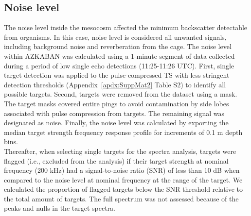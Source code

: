 \subsection{Noise level}
The noise level inside the mesocosm affected the minimum backscatter detectable from organisms. In this case, noise level is considered all unwanted signals, including background noise and reverberation from the cage. The noise level within AZKABAN was calculated using a 1-minute segment of data collected during a period of low single echo detections (11:25-11:26 UTC). First, single target detection was applied to the pulse-compressed TS with less stringent detection thresholds (Appendix~\ref{apdx:SuppMat2} Table S2) to identify all possible targets. Second, targets were removed from the dataset using a mask. The target masks covered entire pings to avoid contamination by side lobes associated with pulse compression from targets. The remaining signal was designated as noise. Finally, the noise level was calculated by exporting the median target strength frequency response profile for increments of 0.1 m depth bins.\\
Thereafter, when selecting single targets for the spectra analysis, targets were flagged (i.e., excluded from the analysis) if their target strength at nominal frequency (200 kHz) had a signal-to-noise ratio (SNR) of less than 10 dB \citep{Simmonds2008} when compared to the noise level at nominal frequency at the range of the target. We calculated the proportion of flagged targets below the SNR threshold relative to the total amount of targets. The full spectrum was not assessed because of the peaks and nulls in the target spectra.\\


